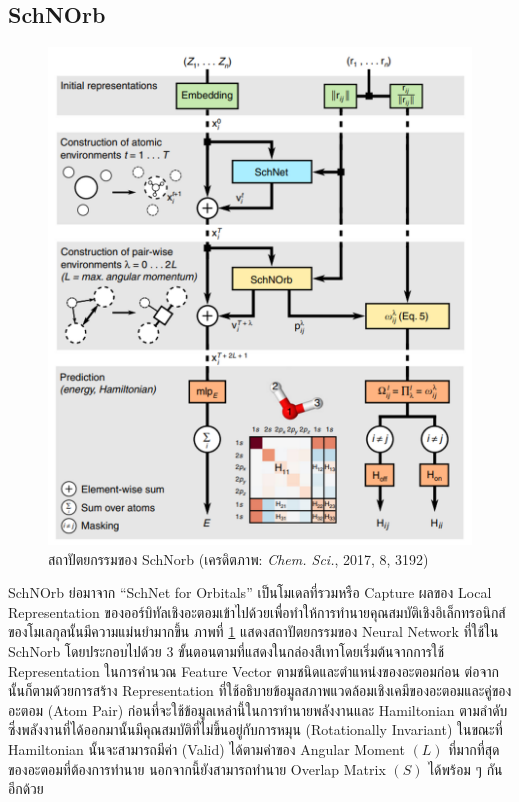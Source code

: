 \subsection{SchNOrb}
\label{ssec:schnorb}

\begin{figure}[H]
    \centering
    \includegraphics[width=0.8\linewidth]{fig/schnorb.png}
    \caption{สถาปัตยกรรมของ SchNorb (เครดิตภาพ: \textit{Chem. Sci.}, 2017, 8, 3192)}
    \label{fig:schnorb_architect}
\end{figure}

SchNOrb ย่อมาจาก \enquote{SchNet for Orbitals}\autocite{schutt2019a} เป็นโมเดลที่รวมหรือ Capture ผลของ Local Representation ของออร์บิทัลเชิงอะตอมเข้าไปด้วยเพื่อทำให้การทำนายคุณสมบัติเชิงอิเล็กทรอนิกส์ของโมเลกุลนั้นมีความแม่นยำมากขึ้น ภาพที่ \ref{fig:schnorb_architect} แสดงสถาปัตยกรรมของ Neural Network ที่ใช้ใน SchNorb โดยประกอบไปด้วย 3 ขั้นตอนตามที่แสดงในกล่องสีเทาโดยเริ่มต้นจากการใช้ Representation ในการคำนวณ Feature Vector ตามชนิดและตำแหน่งของอะตอมก่อน ต่อจากนั้นก็ตามด้วยการสร้าง Representation ที่ใช้อธิบายข้อมูลสภาพแวดล้อมเชิงเคมีของอะตอมและคู่ของอะตอม (Atom Pair) ก่อนที่จะใช้ข้อมูลเหล่านี้ในการทำนายพลังงานและ Hamiltonian ตามลำดับ ซึ่งพลังงานที่ได้ออกมานั้นมีคุณสมบัติที่ไม่ขึ้นอยู่กับการหมุน (Rotationally Invariant) ในขณะที่ Hamiltonian นั้นจะสามารถมีค่า (Valid) ได้ตามค่าของ Angular Moment $(L)$ ที่มากที่สุดของอะตอมที่ต้องการทำนาย นอกจากนี้ยังสามารถทำนาย Overlap Matrix $(S)$ ได้พร้อม ๆ กันอีกด้วย


